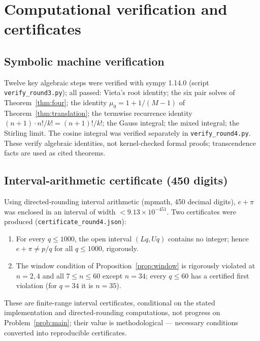 \documentclass[11pt]{amsart}
\theoremstyle{definition}
\theoremstyle{remark}
\numberwithin{equation}{section}
\newcommand{\irr}{\mu}
\begin{document}
\section{Computational verification and certificates}\label{sec:computation}

\subsection{Symbolic machine verification}

Twelve key algebraic steps were verified with sympy 1.14.0 (script \texttt{verify\_round3.py}); all passed: Vieta's root identity; the six pair solves of Theorem~\ref{thm:four}; the identity $\irr_0=1+1/(M-1)$ of Theorem~\ref{thm:translation}; the termwise recurrence identity $(n+1)\cdot n!/k!=(n+1)!/k!$; the Gauss integral; the mixed integral; the Stirling limit. The cosine integral was verified separately in \texttt{verify\_round4.py}. These verify algebraic identities, not kernel-checked formal proofs; transcendence facts are used as cited theorems.

\subsection{Interval-arithmetic certificate (450 digits)}

Using directed-rounding interval arithmetic (mpmath, 450 decimal digits), $e+\pi$ was enclosed in an interval of width $<9.13\times10^{-451}$. Two certificates were produced (\texttt{certificate\_\allowbreak{}round4.json}):
\begin{enumerate}
\item For every $q\le1000$, the open interval $(Lq,Uq)$ contains no integer; hence $e+\pi\ne p/q$ for all $q\le1000$, rigorously.
\item The window condition of Proposition~\ref{prop:window} is rigorously violated at $n=2,4$ and all $7\le n\le60$ except $n=34$; every $q\le60$ has a certified first violation (for $q=34$ it is $n=35$).
\end{enumerate}
These are finite-range interval certificates, conditional on the stated implementation and directed-rounding computations, not progress on Problem~\ref{prob:main}; their value is methodological --- necessary conditions converted into reproducible certificates.
\end{document}

